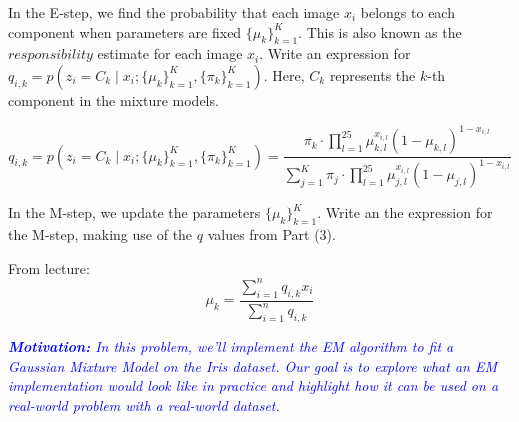 \documentclass{article}
\begin{document}
\begin{probset}
\begin{prob}
\begin{subprobset}
\begin{subprob}
\begin{soln}
\begin{center}
                \end{center}
            \end{soln}
        \end{subprob}

        \newpage

        \begin{subprob}
            In the E-step, we find the probability that each image $x_i$ belongs to each component when parameters are fixed $\{\mu_k\}_{k=1}^K$. This is also known as the $responsibility$ estimate for each image $x_i$. Write an expression for $q_{i,k} = p(z_i = C_k \mid x_i; \{\mu_k\}_{k=1}^K, \{\pi_k\}_{k=1}^K)$. Here, $C_k$ represents the $k$-th component in the mixture models.

            \begin{soln}
                \[
                    q_{i,k} = p(z_i = C_k \mid x_i; \{\mu_k\}_{k=1}^K, \{\pi_k\}_{k=1}^K)
                    = \frac{\pi_k \cdot \prod_{l=1}^{25} \mu_{k,l}^{x_{i,l}} (1 - \mu_{k,l})^{1 - x_{i,l}}}{\sum_{j=1}^K \pi_j \cdot \prod_{l=1}^{25} \mu_{j,l}^{x_{i,l}} (1 - \mu_{j,l})^{1 - x_{i,l}}}
                \]
            \end{soln}
        \end{subprob}

        \begin{subprob}
            In the M-step, we update the parameters $\{\mu_k\}_{k=1}^K$. Write an the expression for the M-step, making use of the $q$ values from Part (3).

            \begin{soln}
                From lecture: 
                \[
                    \mu_k = \frac{\sum_{i=1}^n q_{i,k} x_i}{\sum_{i=1}^n q_{i,k}}
                \]
            \end{soln}
        \end{subprob}
    \end{subprobset}
\end{prob}

\newpage
\begin{prob}
    \textit{\textcolor{blue}{\textbf{Motivation:} In this problem, we'll implement the EM algorithm to fit a Gaussian Mixture Model on the Iris dataset. Our goal is to explore what an EM implementation would look like in practice and highlight how it can be used on a real-world problem with a real-world dataset.}}


\end{prob}
\end{probset}
\end{document}
